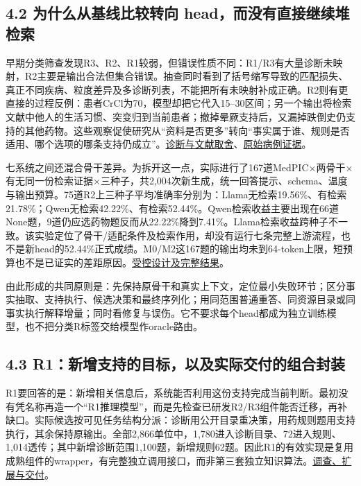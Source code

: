 \documentclass[
  11pt,
  a4paper,
]{article}
\begin{document}
\subsection{4.2 为什么从基线比较转向
head，而没有直接继续堆检索}\label{ux4e3aux4ec0ux4e48ux4eceux57faux7ebfux6bd4ux8f83ux8f6cux5411-headux800cux6ca1ux6709ux76f4ux63a5ux7ee7ux7eedux5806ux68c0ux7d22}

早期分类筛查发现R3、R2、R1较弱，但错误性质不同：R1/R3有大量诊断未映射，R2主要是输出合法但集合错误。抽查同时看到了括号缩写导致的匹配损失、真正不同疾病、粒度差异及多诊断列表，不能把所有未映射补成正确。R2则有更直接的过程反例：患者CrCl为70，模型却把它代入15--30区间；另一个输出将检索文献中他人的生活习惯、突变归到当前患者；撤掉晕厥支持后，又漏掉跌倒史仍支持的其他药物。这些观察促使研究从``资料是否更多''转向``事实属于谁、规则是否适用、哪个选项的哪条支持仍成立''。\href{https://github.com/xiotakut/cf_mrg/blob/main/papers/2026-10-02_cf_moa/author_dossier/records/research/optimization.md\#L138}{诊断与文献取舍}、\href{https://github.com/xiotakut/cf_mrg/blob/main/papers/2026-10-02_cf_moa/author_dossier/records/research/r2_support_head.md\#L677}{原始病例证据}。

七系统之间还混合骨干差异。为拆开这一点，实际进行了167道MedPIC×两骨干×有无同一份检索证据×三种子，共2,004次新生成，统一回答提示、schema、温度与输出预算。75道R2上三种子平均准确率分别为：Llama无检索19.56\%、有检索21.78\%；Qwen无检索42.22\%、有检索52.44\%。Qwen检索收益主要出现在66道None题，9道仍应选药物题反而从22.22\%降到7.41\%。Llama检索收益跨种子不一致。该实验定位了骨干/适配条件及检索作用，却没有运行七条完整上游流程，也不是新head的52.44\%正式成绩。M0/M2这167题的输出均未到64-token上限，短预算也不是已证实的差距原因。\href{https://github.com/xiotakut/cf_mrg/blob/main/papers/2026-10-02_cf_moa/author_dossier/records/research/r2_support_head.md\#L805}{受控设计及完整结果}。

由此形成的共同原则是：先保持原骨干和真实上下文，定位最小失败环节；区分事实抽取、支持执行、候选决策和最终序列化；用同范围普通重答、同资源目录或同事实执行解释增量；同时看修复与误伤。它不要求每个head都成为独立训练模型，也不把分类R标签交给模型作oracle路由。

\subsection{4.3
R1：新增支持的目标，以及实际交付的组合封装}\label{r1ux65b0ux589eux652fux6301ux7684ux76eeux6807ux4ee5ux53caux5b9eux9645ux4ea4ux4ed8ux7684ux7ec4ux5408ux5c01ux88c5}

R1要回答的是：新增相关信息后，系统能否利用这份支持完成当前判断。最初没有凭名称再造一个``R1推理模型''，而是先检查已研发R2/R3组件能否迁移，再补缺口。实际候选按可见任务结构分派：诊断用公开目录重决策，用药规则题用支持执行，其余保持原输出。全部2,866单位中，1,780进入诊断目录、72进入规则、1,014透传；其中新增诊断范围1,100题，新增规则62题。因此R1的有效实现是复用成熟组件的wrapper，有完整独立调用接口，而非第三套独立知识算法。\href{https://github.com/xiotakut/cf_mrg/blob/main/papers/2026-10-02_cf_moa/author_dossier/records/research/optimization.md\#L380}{调查、扩展与交付}。
\end{document}
